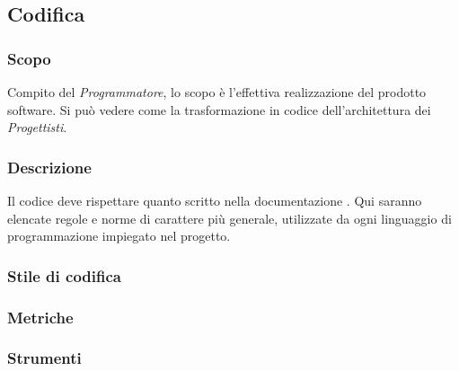 \subsection{Codifica}
\subsubsection{Scopo}
Compito del \textit{Programmatore}, lo scopo è l’effettiva realizzazione del prodotto software. Si può vedere come la trasformazione in codice dell’architettura dei \textit{Progettisti}.

\subsubsection{Descrizione}
Il codice deve rispettare quanto scritto nella documentazione \PdQ. Qui saranno elencate regole e norme di carattere più generale, utilizzate da ogni linguaggio di programmazione impiegato nel progetto.

\subsubsection{Stile di codifica}
\subsubsection{Metriche}
\subsubsection{Strumenti}

